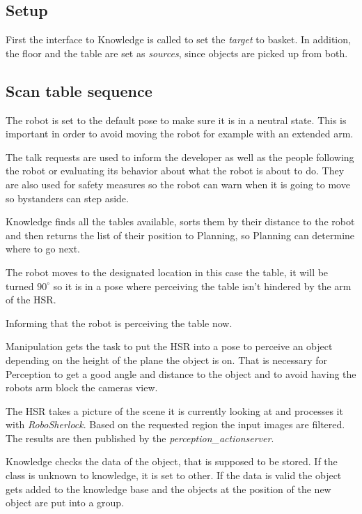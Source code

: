 \documentclass[main.tex]{subfiles}
\begin{document}
	\subsection{Setup}
	First the interface to Knowledge is called to set the \textit{target} to basket. In addition, the floor and the table are set as \textit{sources}, since objects are picked up from both. 

	\subsection{Scan table sequence}
	The robot is set to the default pose to make sure it is in a neutral state. This is important in order to avoid moving the robot for example with an extended arm.
	
	The talk requests are used to inform the developer as well as the people following the robot or evaluating its behavior about what the robot is about to do. They are also used for safety measures so the robot can warn when it is going to move so bystanders can step aside. 
	
	Knowledge finds all the tables available, sorts them by their distance to the robot and then returns the list of their position to Planning, so Planning can determine where to go next.
	
	The robot moves to the designated location in this case the table, it will be turned $90^\circ$ so it is in a pose where perceiving the table isn't hindered by the arm of the HSR. 
	
	Informing that the robot is perceiving the table now.
	
	Manipulation gets the task to put the HSR into a pose to perceive an object depending on the height of the plane the object is on.
    That is necessary for Perception to get a good angle and distance to the object and to avoid having the robots arm block the cameras view.
	
	The HSR takes a picture of the scene it is currently looking at and processes it with \textit{RoboSherlock}. Based on the requested region the input images are filtered. The results are then published by the \textit{perception\_actionserver}.

	
	Knowledge checks the data of the object, that is supposed to be stored. If the class is unknown to knowledge, it is set to other. If the data is valid the object gets added to the knowledge base and the objects at the position of the new object are put into a group.
	
\end{document}
